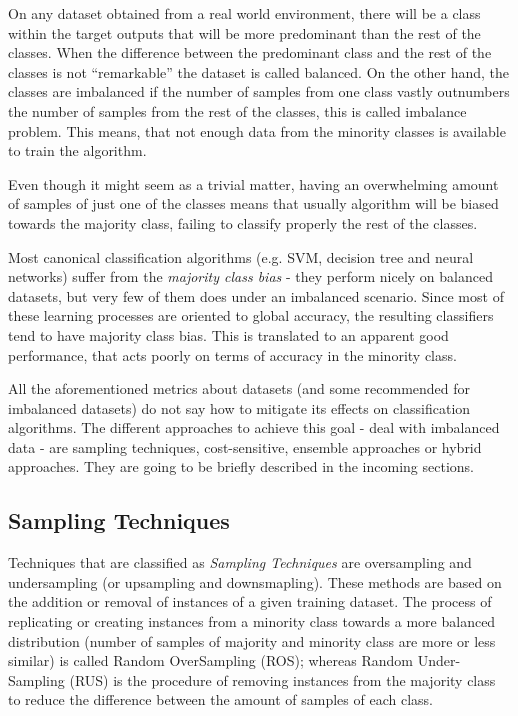 On any dataset obtained from a real world environment, there will be a class 
within the target outputs that will be more predominant than the rest of the 
classes. When the difference between the predominant class and the rest of the 
classes is not ``remarkable'' the dataset is called balanced. On the other hand, 
the classes are imbalanced if the number of samples from one class vastly 
outnumbers the number of samples from the rest of the classes, this is called 
 imbalance problem. This means, that not enough data from the minority classes 
 is available to train the algorithm.

Even though it might seem as a trivial matter, having an overwhelming 
amount of samples of just one of the classes means that usually algorithm will 
be biased towards the majority class, failing to classify properly the rest of 
the classes. 

Most canonical classification algorithms (e.g. SVM, decision tree and neural
networks) suffer from the \textit{majority class bias} - they perform nicely on
balanced datasets, but very few of them does under an imbalanced scenario. 
Since most of these learning processes are oriented to global accuracy, the 
resulting classifiers tend to have majority class bias. This is translated to 
an apparent good performance, that acts poorly on terms of accuracy in the 
minority class.

All the aforementioned metrics about datasets (and some recommended for 
imbalanced datasets) do not say how to mitigate its effects on classification 
algorithms. The different approaches to achieve this goal - deal with imbalanced 
data - are sampling techniques, cost-sensitive, ensemble approaches or hybrid
approaches. They are going to be briefly described in the incoming sections.

\subsection{Sampling Techniques}
\label{subsec:samlpingTech}

Techniques that are classified as \textit{Sampling Techniques} are oversampling 
and undersampling (or upsampling and downsmapling). These methods are based on 
the addition or removal of instances of a given training dataset. The process of
replicating or creating instances from a minority class towards a more balanced
distribution (number of samples of majority and minority class are more or less
similar) is called Random OverSampling (ROS); whereas Random Under-Sampling 
(RUS) is the procedure of removing instances from the majority class to reduce 
the difference between the amount of samples of each class.

